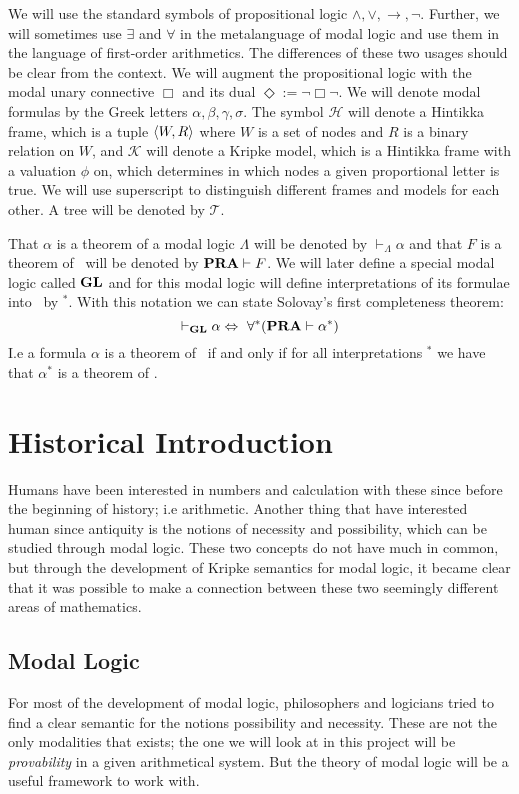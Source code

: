 \documentclass[../main.tex]{subfiles}
\begin{document}
We will use the standard symbols of propositional  logic
$\wedge,\vee,\rightarrow,\neg$. Further, we will sometimes use $\exists$ and
$\forall$ in the metalanguage of modal logic and use them in the language of
first-order arithmetics. The differences of these two usages should be clear
from the context. We will augment the propositional logic with the modal unary
connective $\Box$ and its dual $\Diamond:=\neg\Box\neg$. We will denote modal
formulas by the Greek letters $\alpha,\beta,\gamma,\sigma$. The symbol
$\mathcal{H}$ will denote a
Hintikka frame,  which is a tuple $\langle W,R\rangle$ where $W$ is a set of nodes and
$R$ is a binary relation on $W$, and
$\mathcal{K}$ will denote a Kripke model, which is a Hintikka frame with a
valuation $\phi$ on, which determines in which nodes a given proportional letter
is true. We will use superscript to distinguish different frames
and models for each other.
A tree will be denoted by $\mathcal{T}$.

That $\alpha$ is a theorem of a modal logic $\Lambda$ will be denoted by
$\vdash_\Lambda\alpha$ and that $F$ is a theorem of \PRA\ will be denoted by
$\text{\textbf{PRA}}\vdash F$. We will later define a special modal logic called $\text{\textbf{GL}}$ and for
this modal logic will define interpretations of its formulae into \PRA\ by
$^*$. With this notation we can state Solovay's first completeness theorem:
\[\vdash_{\text{\textbf{GL}}}\alpha\Leftrightarrow\ \forall ^*(\text{\textbf{PRA}}\vdash\alpha^*)\]
I.e a formula $\alpha$ is a theorem of \GL\ if and only if for all
interpretations $^*$ we have that $\alpha^*$ is a theorem of \PRA.

\section{Historical Introduction}
Humans have been interested in numbers and calculation with these since before
the beginning of history; i.e arithmetic. Another thing that have interested
human since antiquity is the notions of necessity and possibility, which can be
studied through modal logic. These two
concepts do not have much in common, but through the development of Kripke
semantics for modal logic, it became clear that it was possible to make a
connection between these two seemingly different areas of mathematics.

\subsection{Modal Logic}

For most of the development of modal logic, philosophers and logicians tried to
find a clear semantic for the notions possibility and necessity. These are not
the only modalities that exists; the one we will look at in this project will
be \textit{provability} in a given arithmetical system. But the theory of modal logic
will be a useful framework to work with.
\end{document}
